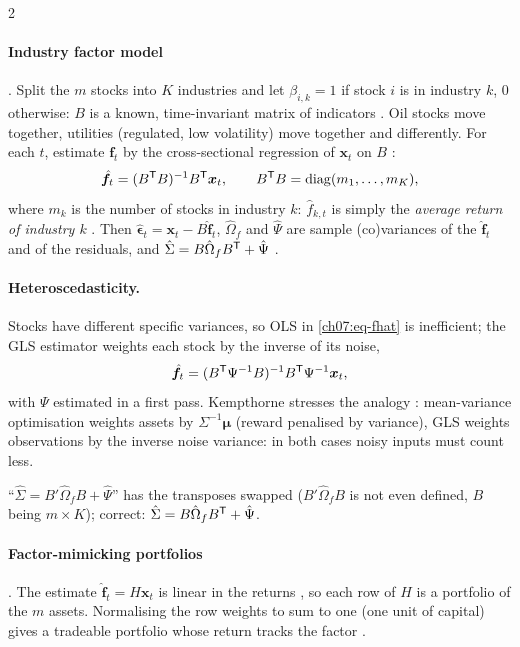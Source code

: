 \begin{paracol}{2}
\paragraph{Industry factor model} . Split the $m$ stocks into $K$ industries and let
$\beta_{i,k}=1$ if stock $i$ is in industry $k$, $0$ otherwise: $B$ is a known, time-invariant matrix of
indicators . Oil stocks move together, utilities (regulated, low volatility) move together
and differently. For each $t$, estimate $\bm f_t$ by the cross-sectional regression of $\bm x_t$ on $B$
:
\begin{equation}\label{ch07:eq-fhat}
  \hat{\bm f}_t=(B^{\mathsf T} B)^{-1}B^{\mathsf T}\bm x_t,\qquad B^{\mathsf T} B=\operatorname{diag}(m_1,\dots,m_K),
\end{equation}
where $m_k$ is the number of stocks in industry $k$: $\hat f_{k,t}$ is simply the \emph{average return of industry $k$}
. Then $\hat{\bm\epsilon}_t=\bm x_t-B\hat{\bm f}_t$, $\hat\Omega_f$ and $\hat\Psi$ are sample (co)variances of the
$\hat{\bm f}_t$ and of the residuals, and $\hat\Sigma=B\hat\Omega_fB^{\mathsf T}+\hat\Psi$ .

\paragraph{Heteroscedasticity.} Stocks have different specific variances, so OLS in \eqref{ch07:eq-fhat} is
inefficient; the GLS estimator weights each stock by the inverse of its noise,
\[
  \hat{\bm f}_t=(B^{\mathsf T}\Psi^{-1}B)^{-1}B^{\mathsf T}\Psi^{-1}\bm x_t ,
\]
with $\Psi$ estimated in a first pass. Kempthorne stresses the analogy : mean-variance
optimisation weights assets by $\Sigma^{-1}\bm\mu$ (reward penalised by variance), GLS weights observations by the
inverse noise variance: in both cases noisy inputs must count less.

\begin{coursenote}
``$\hat\Sigma=B'\hat\Omega_fB+\hat\Psi$'' has the transposes swapped ($B'\hat\Omega_fB$ is not even defined, $B$ being $m\times K$);
correct: $\hat\Sigma=B\hat\Omega_fB^{\mathsf T}+\hat\Psi$.
\end{coursenote}

\paragraph{Factor-mimicking portfolios} . The estimate $\hat{\bm f}_t=H\bm x_t$ is linear in the returns
, so each row of $H$ is a portfolio of the $m$ assets. Normalising the row weights to sum to one
(one unit of capital) gives a tradeable portfolio whose return tracks the factor .


\end{paracol}
